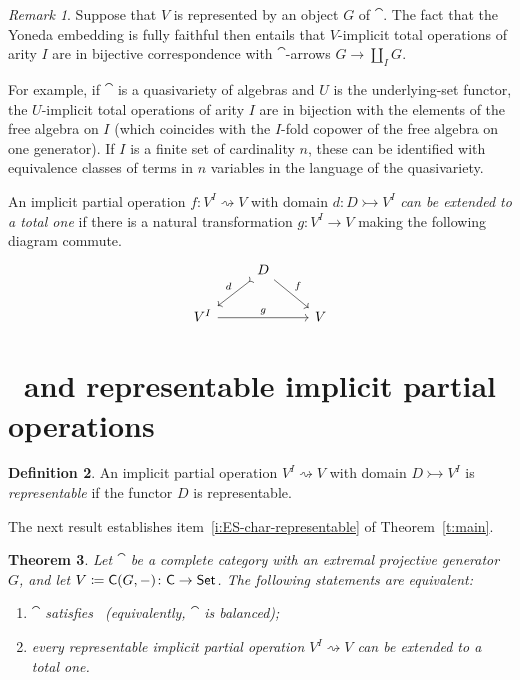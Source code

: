 \documentclass[a4paper,10pt,reqno]{amsart}
\newtheorem{theorem}{Theorem}[section]
\theoremstyle{definition}
\newtheorem{definition}[theorem]{Definition}
\theoremstyle{remark}
\newtheorem{remark}[theorem]{Remark}
\begin{document}
\begin{remark}\label{rmk:partial-total-ops}
Suppose that $V$ is represented by an object $G$ of $\cat$. The fact that the Yoneda embedding is fully faithful then entails that $V$-implicit total operations of arity $I$ are in bijective correspondence with $\cat$-arrows $G \to \coprod_{I}{G}$. 

For example, if $\cat$ is a quasivariety of algebras and $U$ is the underlying-set functor, the $U$-implicit total operations of arity $I$ are in bijection with the elements of the free algebra on $I$ (which coincides with the $I$-fold copower of the free algebra on one generator). If $I$ is a finite set of cardinality $n$, these can be identified with equivalence classes of terms in $n$ variables in the language of the quasivariety.
\end{remark}

An implicit partial operation $f\colon V^{I}\rightsquigarrow V$ with domain $d\colon D\rightarrowtail V^{I}$ \emph{can be extended to a total one} if there is a natural transformation $g\colon V^{I}\to V$ making the following diagram commute.
\[\begin{tikzcd}
& D \arrow[rightarrowtail]{dl}[swap]{d} \arrow{dr}{f} & \\
V^{I} \arrow{rr}{g} & & V
\end{tikzcd}\]
%

\section{\ES~and representable implicit partial operations}\label{s:implicit-ES}

\begin{definition}
An implicit partial operation $V^{I} \rightsquigarrow V$ with domain $D\rightarrowtail V^{I}$ is \emph{representable} if the functor $D$ is representable.
\end{definition}

The next result establishes item~\ref{i:ES-char-representable} of Theorem~\ref{t:main}.

\begin{theorem}\label{t:ES-vs-implicit-operations}
Let $\cat$ be a complete category with an extremal projective generator~$G$, and let $V\coloneqq {\sf C}(G,-)\colon{\sf C}\to{\sf Set}$. The following statements are equivalent:
%
\begin{enumerate}[label=(\arabic*),series=implicitops]
\item\label{i:Cat-satisfies-ES} $\cat$ satisfies \ES~(equivalently, $\cat$ is balanced);
\item\label{i:representable-admits-extension} every representable implicit partial operation $V^{I} \rightsquigarrow V$ can be extended to a total one.
\end{enumerate}
\end{theorem}
\end{document}
